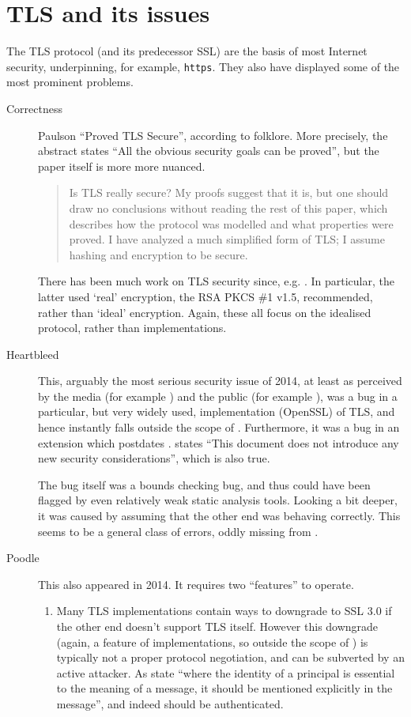 \documentclass{eptcs}
\begin{document}
\section{TLS and its issues}
The TLS protocol (and its predecessor SSL) are the basis of most Internet security, underpinning, for example, \verb+https+. They also have displayed some of the most prominent problems.
\begin{description}
\item[Correctness]Paulson \cite{Paulson1999} ``Proved TLS Secure'', according to folklore. More precisely, the abstract states ``All the
obvious security goals can be proved'', but the paper itself is more more nuanced.
\begin{quote}
Is TLS really secure? My proofs suggest that it is, but one should draw no conclusions without reading the rest of this paper, which describes how the protocol
was modelled and what properties were proved. I have analyzed a much simplified
form of TLS; I assume hashing and encryption to be secure.
\end{quote}
There has been much work on TLS security since, e.g. \cite{Heetal2005,Krawczyketal2013a}. In particular, the latter used `real' encryption, the RSA PKCS \#1 v1.5, recommended, rather than `ideal' encryption. Again, these all focus on the idealised protocol, rather than implementations.
\item[Heartbleed \cite{NIST2014a}]This, arguably the most serious security issue of 2014, at least as perceived by the media (for example \cite{BBC2014b}) and the public (for example \cite{Steinberg2014a}), was a bug in a particular, but very widely used, implementation (OpenSSL) of TLS, and hence instantly falls outside the scope of \cite{Paulson1999}. Furthermore, it was a bug in an extension \cite{Seggelmannetal2012a} which postdates \cite{Paulson1999}.  \cite{Seggelmannetal2012a} states ``This document does not introduce any new security    considerations'', which is also true.
\par
The bug itself was a bounds checking bug, and thus could have been flagged by even relatively weak static analysis tools.  Looking a bit deeper, it was caused by assuming that the other end was behaving correctly. This seems to be a general class of errors, oddly missing from \cite{AndersonNeedham1995}.
\item[Poodle \cite{Molleretal2014a,NIST2014b}]This also appeared in 2014. It requires two ``features'' to operate.
\begin{enumerate}
\item Many TLS implementations contain ways to downgrade to SSL 3.0 if the other end doesn't support TLS itself. However this downgrade (again, a feature of implementations, so outside the scope of \cite{Paulson1999}) is typically not a proper protocol negotiation, and can be subverted by an active attacker. As \cite{AndersonNeedham1995} state ``where the identity of a principal is essential to the meaning of a message, it should be mentioned explicitly in the message'', and indeed should be authenticated.

\end{enumerate}
\end{description}
\end{document}
